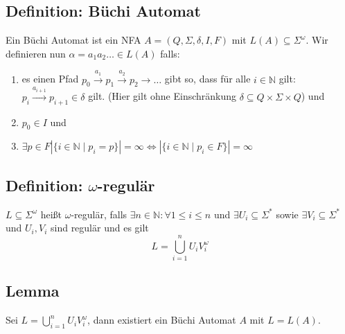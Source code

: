 \documentclass[12pt, german]{article}
\newcommand{\N}{\mathbb{N}}
\newcommand{\sigstern}{\Sigma^\ast}
\newcommand{\pom}{^{\omega}}
\begin{document}
\subsection{Definition: Büchi Automat}
	Ein Büchi Automat ist ein NFA $A = (Q, \Sigma, \delta, I, F)$ mit $L(A) \subseteq \Sigma\pom$. Wir definieren nun $\alpha = a_1a_2\ldots \in L(A)$ falls:
	\begin{enumerate}[label = \arabic*.)]
		\item es einen Pfad $p_0 \overset{a_1}{\longrightarrow}p_1 \overset{a_2}{\longrightarrow} p_2 \longrightarrow \ldots$ gibt so, dass für alle $i\in \N$ gilt: $p_i \overset{a_{i+1}}{\longrightarrow} p_{i+1} \in \delta$ gilt. (Hier gilt ohne Einschränkung $\delta \subseteq Q \times \Sigma \times Q$) und
		\item $p_0 \in I$  und
		\item $\exists p \in F |\{i \in \N \mid p_i = p\}| = \infty \iff |\{i \in \N \mid p_i \in F\}| = \infty$
	\end{enumerate}

\subsection{Definition: $\omega$-regulär}
	$L \subseteq \Sigma\pom$ hei\ss t $\omega$-regulär, falls $\exists n \in \N : \forall 1 \leq i \leq n$ und $\exists U_i \subseteq \sigstern$ sowie $\exists V_i \subseteq \sigstern$ und $U_i, V_i$ sind regulär und es gilt $$L = \bigcup_{i = 1}^n U_i V_i\pom$$
	
\subsection{Lemma}
	Sei $L = \bigcup_{i = 1}^n U_i V_i\pom$, dann existiert ein Büchi Automat $A$ mit $L=L(A)$.
\end{document}
